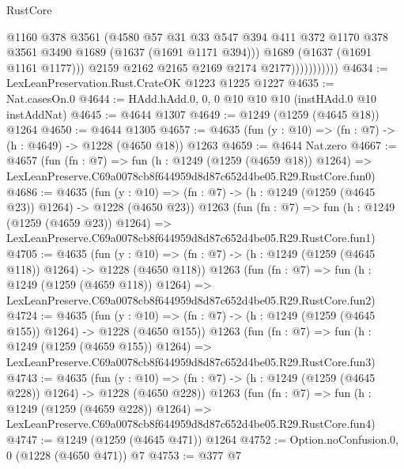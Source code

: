 \begin{lexlean}{RustCore}
\begin{coremodule}
                            @1160
                            @378
                            @3561
                            (@4580
                              @57
                              @31
                              @33
                              @547
                              @394
                              @411
                              @372
                              @1170
                              @378
                              @3561
                              @3490
                              @1689
                              (@1637 (@1691 @1171 @394)))
                            @1689
                            (@1637 (@1691 @1161 @1177)))
                          @2159
                          @2162
                          @2165
                          @2169
                          @2174
                          @2177)))))))))))
@4634 := LexLeanPreservation.Rust.CrateOK @1223 @1225 @1227
@4635 := Nat.casesOn.{0}
@4644 := HAdd.hAdd.{0, 0, 0} @10 @10 @10 (instHAdd.{0} @10 instAddNat)
@4645 := @4644 @1307
@4649 := @1249 (@1259 (@4645 @18)) @1264
@4650 := @4644 @1305
@4657 := @4635 (fun (y : @10) => (fn : @7) -> (h : @4649) -> @1228 (@4650 @18)) @1263
@4659 := @4644 Nat.zero
@4667 := @4657
    (fun (fn : @7) =>
    fun (h : @1249 (@1259 (@4659 @18)) @1264) =>
    LexLeanPreserve.C69a0078cb8f644959d8d87c652d4be05.R29.RustCore.fun0)
@4686 := @4635
    (fun (y : @10) => (fn : @7) -> (h : @1249 (@1259 (@4645 @23)) @1264) -> @1228 (@4650 @23))
    @1263
    (fun (fn : @7) =>
    fun (h : @1249 (@1259 (@4659 @23)) @1264) =>
    LexLeanPreserve.C69a0078cb8f644959d8d87c652d4be05.R29.RustCore.fun1)
@4705 := @4635
    (fun (y : @10) => (fn : @7) -> (h : @1249 (@1259 (@4645 @118)) @1264) -> @1228 (@4650 @118))
    @1263
    (fun (fn : @7) =>
    fun (h : @1249 (@1259 (@4659 @118)) @1264) =>
    LexLeanPreserve.C69a0078cb8f644959d8d87c652d4be05.R29.RustCore.fun2)
@4724 := @4635
    (fun (y : @10) => (fn : @7) -> (h : @1249 (@1259 (@4645 @155)) @1264) -> @1228 (@4650 @155))
    @1263
    (fun (fn : @7) =>
    fun (h : @1249 (@1259 (@4659 @155)) @1264) =>
    LexLeanPreserve.C69a0078cb8f644959d8d87c652d4be05.R29.RustCore.fun3)
@4743 := @4635
    (fun (y : @10) => (fn : @7) -> (h : @1249 (@1259 (@4645 @228)) @1264) -> @1228 (@4650 @228))
    @1263
    (fun (fn : @7) =>
    fun (h : @1249 (@1259 (@4659 @228)) @1264) =>
    LexLeanPreserve.C69a0078cb8f644959d8d87c652d4be05.R29.RustCore.fun4)
@4747 := @1249 (@1259 (@4645 @471)) @1264
@4752 := Option.noConfusion.{0, 0} (@1228 (@4650 @471)) @7
@4753 := @377 @7

\end{coremodule}
\end{lexlean}

